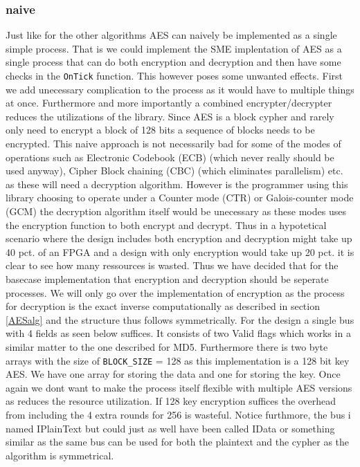 \documentclass[a4paper]{article}
\begin{document}
\subsubsection{naive}
\label{sec:org991bbf3}
Just like for the other algorithms AES can naively be implemented as a single simple process. That is we could implement the SME implentation of AES as a single process that can do both encryption and decryption and then have some checks in the \texttt{OnTick} function. This however poses some unwanted effects. First we add unecessary complication to the process as it would have to multiple things at once. Furthermore and more importantly a combined encrypter/decrypter reduces the utilizations of the library. Since AES is a block cypher and rarely only need to encrypt a block of 128 bits a sequence of blocks needs to be encrypted. This naive approach is not necessarily bad for some of the modes of operations such as Electronic Codebook (ECB) (which never really should be used anyway), Cipher Block chaining (CBC) (which eliminates parallelism) etc. as these will need a decryption algorithm. However is the programmer using this library choosing to operate under a Counter mode (CTR) or Galois-counter mode (GCM) the decryption algorithm itself would be unecessary as these modes uses the encryption function to both encrypt and decrypt. Thus in a hypotetical scenario where the design includes both encryption and decryption might take up 40 pct. of an FPGA and a design with only encryption would take up 20 pct. it is clear to see how many ressources is wasted. Thus we have decided that for the basecase implementation that encryption and decryption should be seperate processes. We will only go over the implementation of encryption as the process for decryption is the exact inverse computationally as described in section \ref{AESalg} and the structure thus follows symmetrically. For the design a single bus with 4 fields as seen below suffices. It consists of two Valid flags which works in a similar matter to the one described for MD5. Furthermore there is two byte arrays with the size of \texttt{BLOCK\_SIZE} = 128 as this implementation is a 128 bit key AES. We have one array for storing the data and one for storing the key. Once again we dont want to make the process itself flexible with multiple AES versions as reduces the resource utilization. If 128 key encryption suffices the overhead from including the 4 extra rounds for 256 is wasteful. Notice furthmore, the bus i named IPlainText but could just as well have been called IData or something similar as the same bus can be used for both the plaintext and the cypher as the algorithm is symmetrical.
\end{document}
